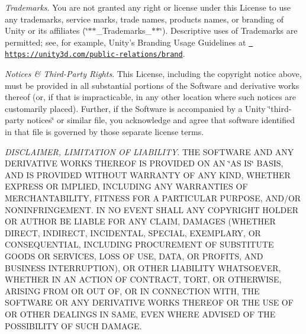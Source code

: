 \begin{DoxyEnumerate}
\item {\itshape Trademarks}. You are not granted any right or license under this License to use any trademarks, service marks, trade names, products names, or branding of Unity or its affiliates (\char`\"{}$\ast$$\ast$\+\_\+\+Trademarks\+\_\+$\ast$$\ast$\char`\"{}). Descriptive uses of Trademarks are permitted; see, for example, Unity’s Branding Usage Guidelines at \href{https://unity3d.com/public-relations/brand}{\texttt{ https\+://unity3d.\+com/public-\/relations/brand}}.
\end{DoxyEnumerate}
\begin{DoxyEnumerate}
\item {\itshape Notices \& Third-\/\+Party Rights}. This License, including the copyright notice above, must be provided in all substantial portions of the Software and derivative works thereof (or, if that is impracticable, in any other location where such notices are customarily placed). Further, if the Software is accompanied by a Unity \char`\"{}third-\/party notices\char`\"{} or similar file, you acknowledge and agree that software identified in that file is governed by those separate license terms.
\end{DoxyEnumerate}
\begin{DoxyEnumerate}
\item {\itshape D\+I\+S\+C\+L\+A\+I\+M\+ER, L\+I\+M\+I\+T\+A\+T\+I\+ON OF L\+I\+A\+B\+I\+L\+I\+TY}. T\+HE S\+O\+F\+T\+W\+A\+RE A\+ND A\+NY D\+E\+R\+I\+V\+A\+T\+I\+VE W\+O\+R\+KS T\+H\+E\+R\+E\+OF IS P\+R\+O\+V\+I\+D\+ED ON AN \char`\"{}\+A\+S I\+S\char`\"{} B\+A\+S\+IS, A\+ND IS P\+R\+O\+V\+I\+D\+ED W\+I\+T\+H\+O\+UT W\+A\+R\+R\+A\+N\+TY OF A\+NY K\+I\+ND, W\+H\+E\+T\+H\+ER E\+X\+P\+R\+E\+SS OR I\+M\+P\+L\+I\+ED, I\+N\+C\+L\+U\+D\+I\+NG A\+NY W\+A\+R\+R\+A\+N\+T\+I\+ES OF M\+E\+R\+C\+H\+A\+N\+T\+A\+B\+I\+L\+I\+TY, F\+I\+T\+N\+E\+SS F\+OR A P\+A\+R\+T\+I\+C\+U\+L\+AR P\+U\+R\+P\+O\+SE, A\+N\+D/\+OR N\+O\+N\+I\+N\+F\+R\+I\+N\+G\+E\+M\+E\+NT. IN NO E\+V\+E\+NT S\+H\+A\+LL A\+NY C\+O\+P\+Y\+R\+I\+G\+HT H\+O\+L\+D\+ER OR A\+U\+T\+H\+OR BE L\+I\+A\+B\+LE F\+OR A\+NY C\+L\+A\+IM, D\+A\+M\+A\+G\+ES (W\+H\+E\+T\+H\+ER D\+I\+R\+E\+CT, I\+N\+D\+I\+R\+E\+CT, I\+N\+C\+I\+D\+E\+N\+T\+AL, S\+P\+E\+C\+I\+AL, E\+X\+E\+M\+P\+L\+A\+RY, OR C\+O\+N\+S\+E\+Q\+U\+E\+N\+T\+I\+AL, I\+N\+C\+L\+U\+D\+I\+NG P\+R\+O\+C\+U\+R\+E\+M\+E\+NT OF S\+U\+B\+S\+T\+I\+T\+U\+TE G\+O\+O\+DS OR S\+E\+R\+V\+I\+C\+ES, L\+O\+SS OF U\+SE, D\+A\+TA, OR P\+R\+O\+F\+I\+TS, A\+ND B\+U\+S\+I\+N\+E\+SS I\+N\+T\+E\+R\+R\+U\+P\+T\+I\+ON), OR O\+T\+H\+ER L\+I\+A\+B\+I\+L\+I\+TY W\+H\+A\+T\+S\+O\+E\+V\+ER, W\+H\+E\+T\+H\+ER IN AN A\+C\+T\+I\+ON OF C\+O\+N\+T\+R\+A\+CT, T\+O\+RT, OR O\+T\+H\+E\+R\+W\+I\+SE, A\+R\+I\+S\+I\+NG F\+R\+OM OR O\+UT OF, OR IN C\+O\+N\+N\+E\+C\+T\+I\+ON W\+I\+TH, T\+HE S\+O\+F\+T\+W\+A\+RE OR A\+NY D\+E\+R\+I\+V\+A\+T\+I\+VE W\+O\+R\+KS T\+H\+E\+R\+E\+OF OR T\+HE U\+SE OF OR O\+T\+H\+ER D\+E\+A\+L\+I\+N\+GS IN S\+A\+ME, E\+V\+EN W\+H\+E\+RE A\+D\+V\+I\+S\+ED OF T\+HE P\+O\+S\+S\+I\+B\+I\+L\+I\+TY OF S\+U\+CH D\+A\+M\+A\+GE.
\end{DoxyEnumerate}
